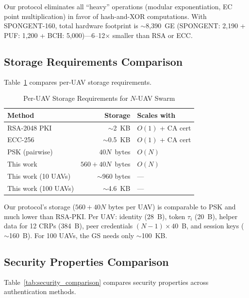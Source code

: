 \documentclass[11pt,a4paper]{article}
\begin{document}
Our protocol eliminates all ``heavy'' operations (modular exponentiation, EC point multiplication) in favor of hash-and-XOR computations. With SPONGENT-160, total hardware footprint is $\sim$8,390~GE (SPONGENT: 2,190 + PUF: 1,200 + BCH: 5,000)---6--12$\times$ smaller than RSA or ECC.

\subsection{Storage Requirements Comparison}

Table~\ref{tab:storage_comparison} compares per-UAV storage requirements.

\begin{table}[H]
\centering
\caption{Per-UAV Storage Requirements for $N$-UAV Swarm}
\label{tab:storage_comparison}
\begin{tabular}{@{}lrl@{}}
\toprule
\textbf{Method} & \textbf{Storage} & \textbf{Scales with} \\
\midrule
RSA-2048 PKI & $\sim$2~KB & $O(1)$ + CA cert \\
ECC-256 & $\sim$0.5~KB & $O(1)$ + CA cert \\
PSK (pairwise) & $40N$~bytes & $O(N)$ \\
This work & $560 + 40N$~bytes & $O(N)$ \\
This work (10 UAVs) & $\sim$960 bytes & --- \\
This work (100 UAVs) & $\sim$4.6~KB & --- \\
\bottomrule
\end{tabular}
\end{table}

Our protocol's storage ($560 + 40N$ bytes per UAV) is comparable to PSK and much lower than RSA-PKI. Per UAV: identity (28~B), token $\tau_i$ (20~B), helper data for 12 CRPs (384~B), peer credentials $(N-1) \times 40$~B, and session keys ($\sim$160~B). For 100 UAVs, the GS needs only $\sim$100~KB.

\subsection{Security Properties Comparison}

Table~\ref{tab:security_comparison} compares security properties across authentication methods.
\end{document}
